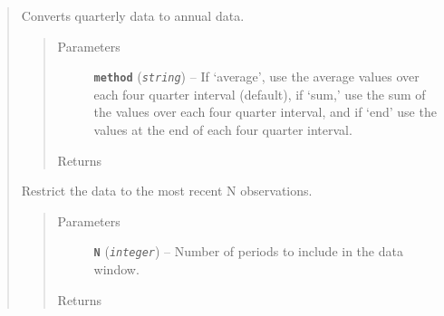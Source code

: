 \documentclass[letterpaper,10pt,english]{sphinxmanual}
\begin{document}
\begin{fulllineitems}
\begin{quote}
\begin{fulllineitems}
\begin{quote}
\begin{description}
\end{description}\end{quote}

\end{fulllineitems}


\begin{fulllineitems}
\label{series_class:fredpy.series.quartertoannual}
Converts quarterly data to annual data.
\begin{quote}\begin{description}
\item[{Parameters}] \leavevmode
\textbf{\texttt{method}} (\emph{\texttt{string}}) -- If `average', use the average values over each four quarter interval (default), if `sum,' use the sum of the values over each four quarter interval, and if `end' use the values at the end of each four quarter interval.

\item[{Returns}] \leavevmode
{\hyperref[series_class:fredpy.series]{}}

\end{description}\end{quote}

\end{fulllineitems}


\begin{fulllineitems}
\label{series_class:fredpy.series.recent}
Restrict the data to the most recent N observations.
\begin{quote}\begin{description}
\item[{Parameters}] \leavevmode
\textbf{\texttt{N}} (\emph{\texttt{integer}}) -- Number of periods to include in the data window.

\item[{Returns}] \leavevmode
{\hyperref[series_class:fredpy.series]{}}

\end{description}\end{quote}

\end{fulllineitems}


\end{quote}
\end{fulllineitems}
\end{document}
